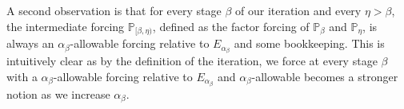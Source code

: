 \documentclass[a4paper,11pt]{article}
\newtheorem{lemma}[theorem]{Lemma}
\newcommand{\forceP}{\mathbb{P}}
\begin{document}

A second observation is that for every stage $\beta$ of our iteration and every $\eta > \beta$, the intermediate forcing $\forceP_{[\beta, \eta)}$, defined as the factor forcing of $\forceP_{\beta}$ and $\forceP_{\eta}$, is always an $\alpha_{\beta}$-allowable forcing relative to $E_{\alpha_{\beta}}$ and some bookkeeping. This is intuitively clear as by the definition of the iteration, we force at every stage $\beta$ with a $\alpha_{\beta}$-allowable forcing  relative to $E_{\alpha_{\beta}}$ and $\alpha_{\beta}$-allowable becomes a stronger notion as we increase $\alpha_{\beta}$.
\end{document}

